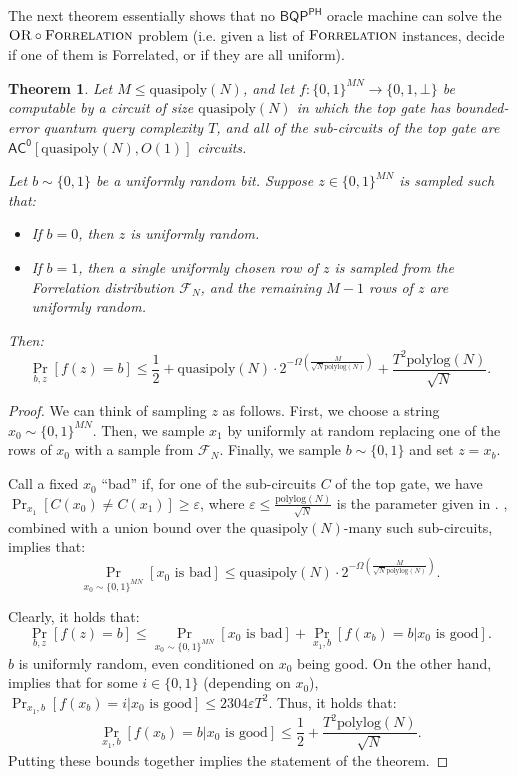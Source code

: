 \documentclass[11pt]{article}%
\newtheorem{theorem}{Theorem}
\newcommand{\eps}{\varepsilon}
\newcommand{\polylog}{\mathrm{polylog}}
\newcommand{\quasipoly}{\mathrm{quasipoly}}
\newcommand{\OR}{\normalfont\textsc{OR}}
\newcommand{\Forrelation}{\normalfont\textsc{Forrelation}}
\begin{document}
The next theorem essentially shows that no $\mathsf{BQP}^\mathsf{PH}$ oracle machine can solve the $\OR \circ \Forrelation$ problem (i.e. given a list of $\Forrelation$ instances, decide if one of them is Forrelated, or if they are all uniform).

\begin{theorem}
\label{thm:bqp_ac0_single_forrelated_block_indistinguishable}
Let $M \le \quasipoly(N)$, and let $f: \{0,1\}^{MN} \to \{0,1,\bot\}$ be computable by a circuit of size $\quasipoly(N)$ in which the top gate has bounded-error quantum query complexity $T$, and all of the sub-circuits of the top gate are $\mathsf{AC^0}[\quasipoly(N), O(1)]$ circuits.

Let $b \sim \{0,1\}$ be a uniformly random bit. Suppose $z \in \{0,1\}^{MN}$ is sampled such that:
\begin{itemize}
\item If $b = 0$, then $z$ is uniformly random.
\item If $b = 1$, then a single uniformly chosen row of $z$ is sampled from the Forrelation distribution $\mathcal{F}_N$, and the remaining $M - 1$ rows of $z$ are uniformly random.
\end{itemize}
Then:
\[
\Pr_{b, z} [f(z) = b] \le \frac{1}{2} + \quasipoly(N) \cdot 2^{-\Omega\left(\frac{M}{\sqrt{N} \polylog(N)}\right)} + \frac{T^2 \polylog(N)}{\sqrt{N}}.
\]
\end{theorem}
\begin{proof}
We can think of sampling $z$ as follows. First, we choose a string $x_0 \sim \{0,1\}^{MN}$. Then, we sample $x_1$ by uniformly at random replacing one of the rows of $x_0$ with a sample from $\mathcal{F}_N$. Finally, we sample $b \sim \{0,1\}$ and set $z = x_b$.

Call a fixed $x_0$ ``bad'' if, for one of the sub-circuits $C$ of the top gate, we have $\Pr_{x_1}[C(x_0) \neq C(x_1)] \ge \eps$, where $\eps \le \frac{\polylog(N)}{\sqrt{N}}$ is the parameter given in . , combined with a union bound over the $\quasipoly(N)$-many such sub-circuits, implies that:
\[
\Pr_{x_0 \sim \{0,1\}^{MN}}\left[x_0 \text{ is bad}\right] \le \quasipoly(N) \cdot 2^{-\Omega\left(\frac{M}{\sqrt{N} \polylog(N)}\right)}.
\]

Clearly, it holds that:
\[
\Pr_{b,z}[f(z) = b] \le \Pr_{x_0 \sim \{0,1\}^{MN}}\left[x_0 \text{ is bad}\right] + \Pr_{x_1,b}\left[f(x_b) = b | x_0 \text{ is good} \right].
\]
$b$ is uniformly random, even conditioned on $x_0$ being good. On the other hand,  implies that for some $i \in \{0,1\}$ (depending on $x_0$), $\Pr_{x_1,b}\left[f(x_b) = i | x_0 \text{ is good} \right] \le 2304\eps T^2$. Thus, it holds that:
\[
\Pr_{x_1,b}\left[f(x_b) = b | x_0 \text{ is good} \right] \le \frac{1}{2} + \frac{T^2 \polylog(N)}{\sqrt{N}}.
\]
Putting these bounds together implies the statement of the theorem.
\end{proof}
\end{document}
